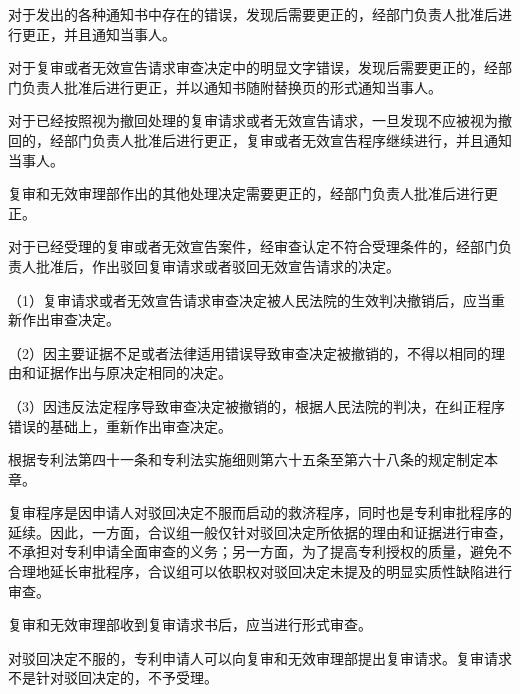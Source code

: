 对于发出的各种通知书中存在的错误，发现后需要更正的，经部门负责人批准后进行更正，并且通知当事人。

对于复审或者无效宣告请求审查决定中的明显文字错误，发现后需要更正的，经部门负责人批准后进行更正，并以通知书随附替换页的形式通知当事人。

对于已经按照视为撤回处理的复审请求或者无效宣告请求，一旦发现不应被视为撤回的，经部门负责人批准后进行更正，复审或者无效宣告程序继续进行，并且通知当事人。

复审和无效审理部作出的其他处理决定需要更正的，经部门负责人批准后进行更正。

对于已经受理的复审或者无效宣告案件，经审查认定不符合受理条件的，经部门负责人批准后，作出驳回复审请求或者驳回无效宣告请求的决定。

{\setlength{\parindent}{17.1bp}（1）复审请求或者无效宣告请求审查决定被人民法院的生效判决撤销后，应当重新作出审查决定。\par}

{\setlength{\parindent}{17.1bp}（2）因主要证据不足或者法律适用错误导致审查决定被撤销的，不得以相同的理由和证据作出与原决定相同的决定。\par}

{\setlength{\parindent}{17.1bp}（3）因违反法定程序导致审查决定被撤销的，根据人民法院的判决，在纠正程序错误的基础上，重新作出审查决定。\par}

根据专利法第四十一条和专利法实施细则第六十五条至第六十八条的规定制定本章。

复审程序是因申请人对驳回决定不服而启动的救济程序，同时也是专利审批程序的延续。因此，一方面，合议组一般仅针对驳回决定所依据的理由和证据进行审查，不承担对专利申请全面审查的义务；另一方面，为了提高专利授权的质量，避免不合理地延长审批程序，合议组可以依职权对驳回决定未提及的明显实质性缺陷进行审查。

复审和无效审理部收到复审请求书后，应当进行形式审查。

对驳回决定不服的，专利申请人可以向复审和无效审理部提出复审请求。复审请求不是针对驳回决定的，不予受理。

